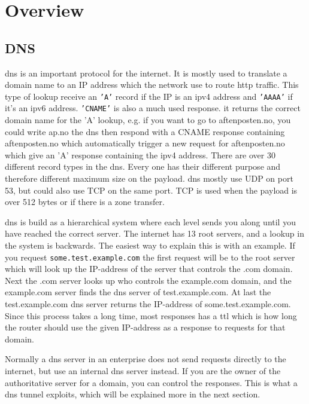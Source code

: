 \chapter{Overview}
\label{chp:overview}

\section{DNS}

\Gls{dns} is an important protocol for the internet. It is mostly used to translate a domain name to an IP address which the network use to route http traffic. This type of lookup receive an \texttt{'A'} record if the IP is an ipv4 address and \texttt{'AAAA'} if it's an ipv6 address. \texttt{'CNAME'} is also a much used response. it returns the correct domain name for the 'A' lookup, e.g. if you want to go to aftenposten.no, you could write ap.no the \Gls{dns} then respond with a CNAME response containing aftenposten.no which automatically trigger a new request for aftenposten.no which give an 'A' response containing the ipv4 address. There are over 30 different record types in the \Gls{dns}. Every one has their different purpose and therefore different maximum size on the payload. \Gls{dns} mostly use UDP on port 53, but could also use TCP on the same port. TCP is used when the payload is over 512 bytes or if there is a zone transfer. 

\Gls{dns} is build as a hierarchical system where each level sends you along until you have reached the correct server. The internet has 13 root servers, and a lookup in the system is backwards. The easiest way to explain this is with an example. If you request \texttt{some.test.example.com} the first request will be to the root server which will look up the IP-address of the server that controls the .com domain. Next the .com server looks up who controls the example.com domain, and the example.com server finds the \Gls{dns} server of test.example.com. At last the test.example.com \Gls{dns} server returns the IP-address of some.test.example.com. Since this process takes a long time, most responses has a \Gls{ttl} which is how long the router should use the given IP-address as a response to requests for that domain.

Normally a \Gls{dns} server in an enterprise does not send requests directly to the internet, but use an internal \Gls{dns} server instead. If you are the owner of the authoritative server for a domain, you can control the responses. This is what a \Gls{dns} tunnel exploits, which will be explained more in the next section. 



